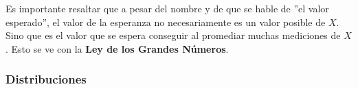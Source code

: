 \documentclass[../main.tex]{subfiles}
\begin{document}
Es importante resaltar que a pesar del nombre y de que se hable de ''el valor esperado'', el valor de la esperanza no necesariamente es un valor posible de \(X\). Sino que es el valor que se espera conseguir al promediar muchas mediciones de \(X\). Esto se ve con la \textbf{Ley de los Grandes Números}.


\subsubsection{Distribuciones}
\end{document}
